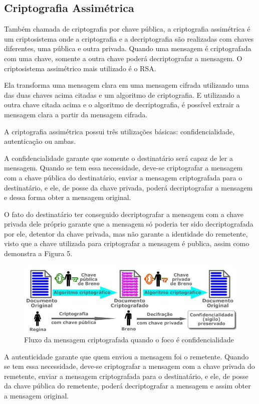 \subsection{Criptografia Assimétrica}
\label{subsec:criptografiaasync}
Também chamada de criptografia por chave pública, a criptografia assimétrica é um criptosistema onde a criptografia e a decriptografia são realizadas com chaves diferentes, uma pública e outra privada. Quando uma mensagem é criptografada com uma chave, somente a outra chave poderá decriptografar  a mensagem. O criptosistema assimétrico mais utilizado é o RSA.

Ela transforma uma mensagem clara em uma mensagem cifrada utilizando uma das duas chaves acima citadas e um algoritmo de criptografia. E utilizando a outra chave citada acima e o algoritmo de decriptografia, é possível extrair a mensagem clara a partir da mensagem cifrada.

A criptografia assimétrica possui três utilizações básicas: confidencialidade, autenticação ou ambas.

A confidencialidade garante que somente o destinatário será capaz de ler a mensagem. Quando se tem essa necessidade, deve-se criptografar a mensagem com a chave pública do destinatário, enviar a mensagem criptografada para o destinatário, e ele, de posse da chave privada, poderá decriptografar a mensagem e dessa forma obter a mensagem original.

O fato do destinatário ter conseguido decriptografar a mensagem com a chave privada dele próprio garante que a mensagem só poderia ter sido decriptografada por ele, detentor da chave privada, mas não garante a identidade do remetente, visto que a chave utilizada para criptografar a mensagem é publica, assim como demonstra a Figura 5.

\begin{figure}[H]
    \centering
    \caption{Fluxo da mensagem criptografada quando o foco é confidencialidade}
    \includegraphics[width=.8\linewidth]{Figuras/Confidencialidade.png}
\end{figure}

A autenticidade garante que quem enviou a mensagem foi o remetente. Quando se tem essa necessidade, deve-se criptografar a mensagem com a chave privada do remetente, enviar a mensagem criptografada para o destinatário, e ele, de posse da chave pública do remetente, poderá decriptografar a mensagem e assim obter a mensagem original.

